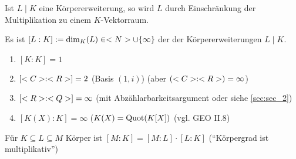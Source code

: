 \begin{remark}
	Ist $L\mid K$ eine Körpererweiterung, so wird $L$ durch Einschränkung der Multiplikation zu einem $K$-Vektorraum.
\end{remark}

\begin{definition}[Körpergrad]
	Es ist $[L:K]:= \dim_K(L) \in <N> \cup \{\infty\}$ der  der Körpererweiterungen $L\mid K$.
\end{definition}

\begin{example}
	\begin{enumerate}[label=(\alph*)]
		\item $[K: K] = 1$
		\item $[<C>:<R>] = 2$ (Basis $(1,i)$) (aber $(<C>:<R>) = \infty$)
		\item $[<R>:<Q>] = \infty$ (mit Abzählarbarkeitsargument oder siehe \cref{sec:sec_2})
		\item $[K(X):K] = \infty$ ($K(X) = \operatorname{Quot}(K[X])$ (vgl. GEO II.8)
	\end{enumerate}
\end{example}

\begin{proposition}
	Für $K \subseteq L \subseteq M$ Körper ist $[M:K] = [M:L]\cdot [L:K]$ \hspace*{1.5em} (``Körpergrad ist multiplikativ'')
\end{proposition}


